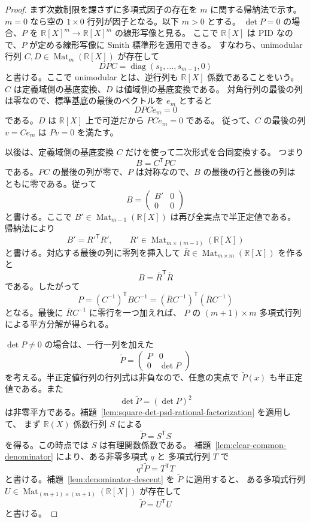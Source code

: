\documentclass[uplatex,dvipdfmx]{jsarticle}
\newcommand{\Poly}{\mathbb{R}[X]}
\newcommand{\Frac}{\mathbb{R}(X)}
\newcommand{\Mat}{\operatorname{Mat}}
\theoremstyle{matrixsosdefinition}
\begin{document}
\begin{proof}
  まず次数制限を課さずに多項式因子の存在を \(m\) に関する帰納法で示す。
  \(m=0\) なら空の \(1\times0\) 行列が因子となる。以下 \(m>0\) とする。
  \(\det P=0\) の場合、\(P\) を
  \(\Poly^m\to\Poly^m\) の線形写像と見る。
  ここで \(\Poly\) は PID なので、\(P\) が定める線形写像に Smith 標準形を適用できる。
  すなわち、unimodular 行列 \(C,D\in\Mat_m(\Poly)\) が存在して
  \[
    DPC=\operatorname{diag}(s_1,\ldots,s_{m-1},0)
  \]
  と書ける。ここで unimodular とは、逆行列も \(\Poly\) 係数であることをいう。
  \(C\) は定義域側の基底変換、\(D\) は値域側の基底変換である。
  対角行列の最後の列は零なので、標準基底の最後のベクトルを \(e_m\) とすると
  \[
    DPCe_m=0
  \]
  である。\(D\) は \(\Poly\) 上で可逆だから \(PCe_m=0\) である。
  従って、\(C\) の最後の列 \(v=Ce_m\) は \(Pv=0\) を満たす。

  以後は、定義域側の基底変換 \(C\) だけを使って二次形式を合同変換する。
  つまり
  \[
    B=C^{\mathsf T}PC
  \]
  である。\(PC\) の最後の列が零で、\(P\) は対称なので、\(B\) の最後の行と最後の列は
  ともに零である。従って
  \[
    B=
    \begin{pmatrix}
      B'&0\\
      0&0
    \end{pmatrix}
  \]
  と書ける。ここで \(B'\in\Mat_{m-1}(\Poly)\) は再び全実点で半正定値である。
  帰納法により
  \[
    B'=R'^{\mathsf T}R',
    \qquad
    R'\in\Mat_{m\times(m-1)}(\Poly)
  \]
  と書ける。対応する最後の列に零列を挿入して
  \(\bar R\in\Mat_{m\times m}(\Poly)\) を作ると
  \[
    B=\bar R^{\mathsf T}\bar R
  \]
  である。したがって
  \[
    P=(C^{-1})^{\mathsf T}BC^{-1}
      =(\bar R C^{-1})^{\mathsf T}(\bar R C^{-1})
  \]
  となる。最後に \(\bar R C^{-1}\) に零行を一つ加えれば、
  \(P\) の \((m+1)\times m\) 多項式行列による平方分解が得られる。

  \(\det P\ne0\) の場合は、一行一列を加えた
  \[
    \widetilde P=
    \begin{pmatrix}
      P&0\\
      0&\det P
    \end{pmatrix}
  \]
  を考える。半正定値行列の行列式は非負なので、任意の実点で
  \(\widetilde P(x)\) も半正定値である。また
    \[
      \det\widetilde P=(\det P)^2
    \]
    は非零平方である。補題~\ref{lem:square-det-psd-rational-factorization} を適用して、
  まず \(\Frac\) 係数行列 \(S\) による
  \[
    \widetilde P=S^{\mathsf T}S
  \]
  を得る。この時点では \(S\) は有理関数係数である。
  補題~\ref{lem:clear-common-denominator} により、ある非零多項式 \(q\) と
  多項式行列 \(T\) で
  \[
    q^2\widetilde P=T^{\mathsf T}T
  \]
  と書ける。補題~\ref{lem:denominator-descent} を \(\widetilde P\) に適用すると、
  ある多項式行列 \(U\in\Mat_{(m+1)\times(m+1)}(\Poly)\) が存在して
  \[
    \widetilde P=U^{\mathsf T}U
  \]
  と書ける。


\end{proof}
\end{document}
